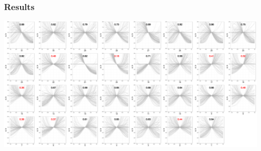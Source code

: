 \documentclass{beamer}
\begin{document}
\begin{frame}
  \frametitle{Results}
  \includegraphics[width=\textwidth,keepaspectratio=true]{figure/cohort_quads}
  
  \tiny{}
\end{frame}
\end{document}
